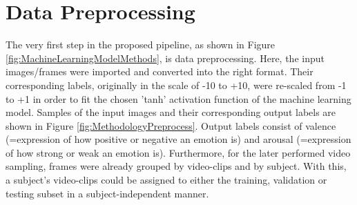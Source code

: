 \section{Data Preprocessing}
The very first step in the proposed pipeline, as shown in Figure \ref{fig:MachineLearningModelMethods}, is data preprocessing. Here, the input images/frames were imported and converted into the right format. Their corresponding labels, originally in the scale of -10 to +10, were re-scaled from -1 to +1 in order to fit the chosen 'tanh' activation function of the machine learning model.
\newline\newline
Samples of the input images and their corresponding output labels are shown in Figure \ref{fig:MethodologyPreprocess}. Output labels consist of valence (=expression of how positive or negative an emotion is) and arousal (=expression of how strong or weak an emotion is).
\newline\newline
Furthermore, for the later performed video sampling, frames were already grouped by video-clips and by subject. With this, a subject's video-clips could be assigned to either the training, validation or testing subset in a subject-independent manner. 

